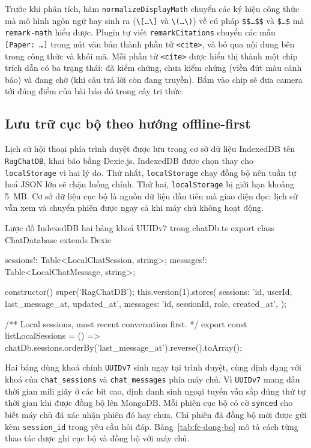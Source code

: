 Trước khi phân tích, hàm \texttt{normalizeDisplayMath} chuyển các ký hiệu công thức mà mô hình ngôn ngữ hay sinh ra (\texttt{\textbackslash[\dots\textbackslash]} và \texttt{\textbackslash(\dots\textbackslash)}) về cú pháp \texttt{\$\$\dots\$\$} và \texttt{\$\dots\$} mà \texttt{remark-math} hiểu được. Plugin tự viết \texttt{remarkCitations} chuyển các mẫu \texttt{[Paper: \dots]} trong nút văn bản thành phần tử \texttt{<cite>}, và bỏ qua nội dung bên trong công thức và khối mã. Mỗi phần tử \texttt{<cite>} được hiển thị thành một chip trích dẫn có ba trạng thái: đã kiểm chứng, chưa kiểm chứng (viền đứt màu cảnh báo) và đang chờ (khi câu trả lời còn đang truyền). Bấm vào chip sẽ đưa camera tới đúng điểm của bài báo đó trong cây tri thức.

\subsection{Lưu trữ cục bộ theo hướng offline-first}
\label{subsec:fe-offline-first}

Lịch sử hội thoại phía trình duyệt được lưu trong cơ sở dữ liệu IndexedDB tên \texttt{RagChatDB}, khai báo bằng Dexie.js. IndexedDB được chọn thay cho \texttt{localStorage} vì hai lý do. Thứ nhất, \texttt{localStorage} chạy đồng bộ nên tuần tự hoá JSON lớn sẽ chặn luồng chính. Thứ hai, \texttt{localStorage} bị giới hạn khoảng 5~MB. Cơ sở dữ liệu cục bộ là nguồn dữ liệu đầu tiên mà giao diện đọc: lịch sử vẫn xem và chuyển phiên được ngay cả khi máy chủ không hoạt động.

\begin{tsbox}{Lược đồ IndexedDB hai bảng khoá UUIDv7 trong chatDb.ts}
export class ChatDatabase extends Dexie {
  sessions!: Table<LocalChatSession, string>;
  messages!: Table<LocalChatMessage, string>;

  constructor() {
    super('RagChatDB');
    this.version(1).stores({
      sessions: 'id, userId, last_message_at, updated_at',
      messages: 'id, sessionId, role, created_at',
    });
  }
}

/** Local sessions, most recent conversation first. */
export const listLocalSessions = () => chatDb.sessions.orderBy('last_message_at').reverse().toArray();
\end{tsbox}

Hai bảng dùng khoá chính \texttt{UUIDv7} sinh ngay tại trình duyệt, cùng định dạng với khoá của \texttt{chat\_\allowbreak{}sessions} và \texttt{chat\_\allowbreak{}messages} phía máy chủ. Vì \texttt{UUIDv7} mang dấu thời gian mili giây ở các bit cao, định danh sinh ngoại tuyến vẫn sắp đúng thứ tự thời gian khi được đồng bộ lên MongoDB. Mỗi phiên cục bộ có cờ \texttt{synced} cho biết máy chủ đã xác nhận phiên đó hay chưa. Chỉ phiên đã đồng bộ mới được gửi kèm \texttt{session\_\allowbreak{}id} trong yêu cầu hỏi đáp. Bảng~\ref{tab:fe-dong-bo} mô tả cách từng thao tác được ghi cục bộ và đồng bộ với máy chủ.

